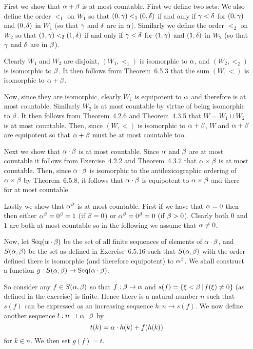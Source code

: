 
\begin{solution}
  First we show that $\alpha + \beta$ is at most countable.
  First we define two sets:
  We also define the order $<_1$ on $W_1$ so that $(0,\gamma) <_1 (0,\delta)$ if and only if $\gamma < \delta$ for $(0, \gamma)$ and $(0, \delta)$ in $W_1$ (so that $\gamma$ and $\delta$ are in $\alpha$).
  Similarly we define the order $<_2$ on $W_2$ so that $(1,\gamma) <_2 (1,\delta)$ if and only if $\gamma < \delta$ for $(1, \gamma)$ and $(1, \delta)$ in $W_2$ (so that $\gamma$ and $\delta$ are in $\beta$).

  Clearly $W_1$ and $W_2$ are disjoint, $(W_1, <_1)$ is isomorphic to $\alpha$, and $(W_2, <_2)$ is isomorphic to $\beta$.
  It then follows from Theorem~6.5.3 that the sum $(W, <)$ is isomorphic to $\alpha + \beta$.

  Now, since they are isomorphic, clearly $W_1$ is equipotent to $\alpha$ and therefore is at most countable.
  Similarly $W_2$ is at most countable by virtue of being isomorphic to $\beta$.
  It then follows from Theorem~4.2.6 and Theorem~4.3.5 that $W = W_1 \cup W_2$ is at most countable.
  Then, since $(W, <)$ is isomorphic to $\alpha + \beta$, $W$ and $\alpha + \beta$ are equipotent so that $\alpha + \beta$ must be at most countable too. \qedsymbol

  Next we show that $\alpha \cdot \beta$ is at most countable.
  Since $\alpha$ and $\beta$ are at most countable it follows from Exercise~4.2.2 and Theorem~4.3.7 that $\alpha \times \beta$ is at most countable.
  Then, since $\alpha \cdot \beta$ is isomorphic to the antilexicographic ordering of $\alpha \times \beta$ by Theorem~6.5.8, it follows that $\alpha \cdot \beta$ is equipotent to $\alpha \times \beta$ and there for at most countable. \qedsymbol

  Lastly we show that $\alpha^\beta$ is at most countable.
  First if we have that $\alpha = 0$ then then either $\alpha^\beta = 0^\beta = 1$ (if $\beta = 0$) or $\alpha^\beta = 0^\beta = 0$ (if $\beta > 0$).
  Clearly both $0$ and $1$ are both at most countable so in the following we assume that $\alpha \neq 0$.

  \def\seqab{\Seq(\a \cdot \b)}
  \def\sab{S(\a, \b)}
  Now, let $\seqab$ be the set of all finite sequences of elements of $\alpha \cdot \beta$, and $\sab$ be the set as defined in Exercise~6.5.16 such that $\sab$ with the order defined there is isomorphic (and therefore equipotent) to $\alpha^\beta$.
  We shall construct a function $g: \sab \to \seqab$.

  So consider any $f \in \sab$ so that $f:\beta \to \alpha$ and $s(f) = \left\{ \xi < \beta \,|\, f(\xi) \neq 0 \right\}$ (as defined in the exercise) is finite.
  Hence there is a natural number $n$ such that $s(f)$ can be expressed as an increasing sequence $h: n \to s(f)$.
  We now define another sequence $t: n \to \alpha \cdot \beta$ by
  $$
  t(k) = \alpha \cdot h(k) + f(h(k))
  $$
  for $k \in n$.
  We then set $g(f) = t$.


\end{solution}
